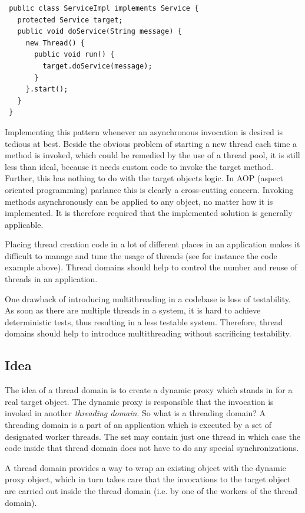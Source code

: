 \small{\begin{verbatim}
 public class ServiceImpl implements Service {
   protected Service target;
   public void doService(String message) {
     new Thread() {
       public void run() {
         target.doService(message);
       }
     }.start();
   }
 }
\end{verbatim}}

Implementing this pattern whenever an asynchronous invocation is desired
is tedious at best. Beside the obvious problem of starting a new thread
each time a method is invoked, which could be remedied by the use of
a thread pool, it is still less than ideal, because it needs custom code
to invoke the target method. Further, this has nothing to do with the
target objects logic. In AOP (aspect oriented programming) parlance this
is clearly a cross-cutting concern. Invoking methods asynchronously can 
be applied to any object, no matter how it is implemented. It is therefore
required that the implemented solution is generally applicable.

Placing thread creation code in a lot of different places in an application
makes it difficult to manage and tune the usage of threads (see for instance
the code example above). Thread domains should help to control the
number and reuse of threads in an application.

One drawback of introducing multithreading in a codebase is loss of
testability. As soon as there are multiple threads in a system, it is
hard to achieve deterministic tests, thus resulting in a less testable
system. Therefore, thread domains should help to introduce multithreading
without sacrificing testability.


\subsection{Idea}
The idea of a thread domain is to create a dynamic proxy which stands
in for a real target object. The dynamic proxy is responsible that the
invocation is invoked in another \emph{threading domain}. So what is
a threading domain? A threading domain is a part of an application
which is executed by a set of designated worker threads. The set may
contain just one thread in which case the code inside that thread domain
does not have to do any special synchronizations.

A thread domain provides a way to wrap an existing object with the dynamic
proxy object, which in turn takes care that the invocations to the
target object are carried out inside the thread domain (i.e. by one of
the workers of the thread domain).

